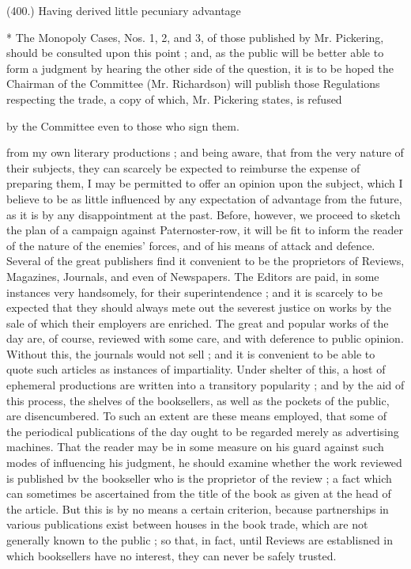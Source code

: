 \documentclass{article}
\begin{document}
(400.) Having derived little pecuniary advantage


* The Monopoly Cases, Nos. 1, 2, and 3, of those published by Mr. Pickering, should be consulted upon this point ; and, as the public will be better able to form a judgment by hearing the other side of the question, it is to be hoped the Chairman of the Committee (Mr. Richardson) will publish those Regulations respecting the trade, a copy of which, Mr. Pickering states, is refused


by the Committee even to those who sign them. 


from my own literary productions ; and being aware, that from the very nature of their subjects, they can scarcely be expected to reimburse the expense of preparing them, I may be permitted to offer an opinion upon the subject, which I believe to be as little influenced by any expectation of advantage from the future, as it is by any disappointment at the past. Before, however, we proceed to sketch the plan of a campaign against Paternoster-row, it will be fit to inform the reader of the nature of the enemies' forces, and of his means of attack and defence. Several of the great publishers find it convenient to be the proprietors of Reviews, Magazines, Journals, and even of Newspapers. The Editors are paid, in some instances very handsomely, for their superintendence ; and it is scarcely to be expected that they should always mete out the severest justice on works by the sale of which their employers are enriched. The great and popular works of the day are, of course, reviewed with some care, and with deference to public opinion. Without this, the journals would not sell ; and it is convenient to be able to quote such articles as instances of impartiality. Under shelter of this, a host of ephemeral productions are written into a transitory popularity ; and by the aid of this process, the shelves of the booksellers, as well as the pockets of the public, are disencumbered. To such an extent are these means employed, that some of the periodical publications of the day ought to be regarded merely as advertising machines. That the reader may be in some measure on his guard against such modes of influencing his judgment, he should examine whether the work reviewed is published bv the bookseller who is the proprietor of the review ; a fact which can sometimes be ascertained from the title of the book as given at the head of the article. But this is by no means a certain criterion, because partnerships in various publications exist between houses in the book trade, which are not generally known to the public ; so that, in fact, until Reviews are establisned in which booksellers have no interest, they can never be safely trusted.
\end{document}
